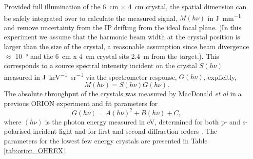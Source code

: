 Provided full illumination of the \qty{6}{cm} $\times$ \qty{4}{cm} crystal, the spatial dimension can be safely integrated over to calculate the measured signal, $M(h\nu)$ in \unit{J.mm^{-1}} and remove uncertainty from the IP drifting from the ideal focal plane. (In this experiment we assume that the harmonic beam width at the crystal position is larger than the size of the crystal, a reasonable assumption since beam divergence $\approx$ \qty{10}{\degree} and the \qty{6}{cm} x \qty{4}{cm} crystal sits \qty{2.4}{m} from the target.). This corresponds to a source spectral intensity incident on the crystal $S(h\nu)$ measured in \unit{J.keV^{-1}.sr^{-1}} via the spectrometer response, $G(h\nu)$, explicitly,
\begin{equation}
	M(h\nu) = S(h\nu)G(h\nu).
\end{equation}
The absolute throughput of the crystals was measured by MacDonald \textit{et al} in a previous ORION experiment and fit parameters for 
\begin{equation}
	G(h\nu) = A(h\nu)^2 + B(h\nu) + C,
\end{equation}
where $(h\nu)$ is the photon energy measured in eV, determined for both p- and s-polarised incident light and for first and second diffraction orders \cite{macdonaldAbsoluteThroughputCalibration2021}. The parameters for the lowest few energy crystals are presented in Table \ref{tab:orion_OHREX}.
